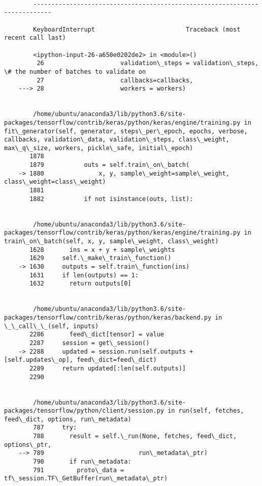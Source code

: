 \documentclass[11pt]{article}
\begin{document}
    \begin{Verbatim}[commandchars=\\\{\}]

        ---------------------------------------------------------------------------

        KeyboardInterrupt                         Traceback (most recent call last)

        <ipython-input-26-a650e0202de2> in <module>()
         26                     validation\_steps = validation\_steps, \# the number of batches to validate on
         27                     callbacks=callbacks,
    ---> 28                     workers = workers)
    

        /home/ubuntu/anaconda3/lib/python3.6/site-packages/tensorflow/contrib/keras/python/keras/engine/training.py in fit\_generator(self, generator, steps\_per\_epoch, epochs, verbose, callbacks, validation\_data, validation\_steps, class\_weight, max\_q\_size, workers, pickle\_safe, initial\_epoch)
       1878 
       1879           outs = self.train\_on\_batch(
    -> 1880               x, y, sample\_weight=sample\_weight, class\_weight=class\_weight)
       1881 
       1882           if not isinstance(outs, list):
    

        /home/ubuntu/anaconda3/lib/python3.6/site-packages/tensorflow/contrib/keras/python/keras/engine/training.py in train\_on\_batch(self, x, y, sample\_weight, class\_weight)
       1628       ins = x + y + sample\_weights
       1629     self.\_make\_train\_function()
    -> 1630     outputs = self.train\_function(ins)
       1631     if len(outputs) == 1:
       1632       return outputs[0]
    

        /home/ubuntu/anaconda3/lib/python3.6/site-packages/tensorflow/contrib/keras/python/keras/backend.py in \_\_call\_\_(self, inputs)
       2286       feed\_dict[tensor] = value
       2287     session = get\_session()
    -> 2288     updated = session.run(self.outputs + [self.updates\_op], feed\_dict=feed\_dict)
       2289     return updated[:len(self.outputs)]
       2290 
    

        /home/ubuntu/anaconda3/lib/python3.6/site-packages/tensorflow/python/client/session.py in run(self, fetches, feed\_dict, options, run\_metadata)
        787     try:
        788       result = self.\_run(None, fetches, feed\_dict, options\_ptr,
    --> 789                          run\_metadata\_ptr)
        790       if run\_metadata:
        791         proto\_data = tf\_session.TF\_GetBuffer(run\_metadata\_ptr)
    


\end{Verbatim}
\end{document}
